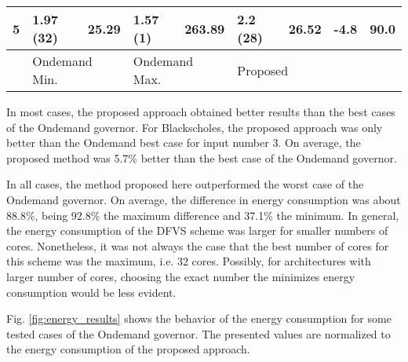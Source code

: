 \begin{table}[H]
{\begin{tabular}{l|l|l|l|l|l|l|ll}
5     & 1.97 (32)                                                                        & 25.29              & 1.57  (1)                                                                        & 263.89             & 2.2 (28)                                                                     & 26.52              & \multicolumn{1}{l|}{-4.8}                 & 90.0                \\ \hline
      & \multicolumn{2}{l|}{Ondemand Min.}                                                                    & \multicolumn{2}{l|}{Ondemand Max.}                                                                    & \multicolumn{2}{l|}{Proposed}                                                                     &                                           &                    
\end{tabular}
}
\end{table}

In most cases, the proposed approach obtained better results than the best cases of the Ondemand governor. For Blackscholes, the proposed approach was only better than the Ondemand best case for input number 3. On average, the proposed method was 5.7\% better than the best case of the Ondemand governor.

In all cases, the method proposed here outperformed the worst case of the Ondemand governor. On average, the difference in energy consumption was about 88.8\%, being 92.8\% the maximum difference and 37.1\% the minimum. In general, the energy consumption of the DFVS scheme was larger for smaller numbers of cores. Nonetheless, it was not always the case that the best number of cores for this scheme was the maximum, i.e. 32 cores. Possibly, for architectures with larger number of cores, choosing the exact number the minimizes energy consumption would be less evident.


Fig. \ref{fig:energy_results} shows the behavior of the energy consumption for some tested cases of the Ondemand governor. The presented values are normalized to the energy consumption of the proposed approach.

